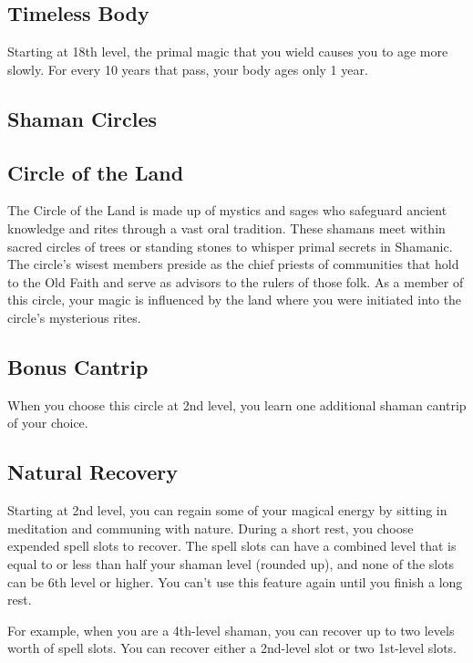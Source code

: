 \subsection{Timeless Body}

Starting at 18th level, the primal magic that you wield causes you to age more slowly. For every 10 years that pass, your body ages only 1 year.

\subsection{Shaman Circles}

\subsection{Circle of the Land}

The Circle of the Land is made up of mystics and sages who safeguard ancient knowledge and rites through a vast oral tradition. These shamans meet within sacred circles of trees or standing stones to whisper primal secrets in Shamanic. The circle's wisest members preside as the chief priests of communities that hold to the Old Faith and serve as advisors to the rulers of those folk. As a member of this circle, your magic is influenced by the land where you were initiated into the circle's mysterious rites.

\subsection{Bonus Cantrip}

When you choose this circle at 2nd level, you learn one additional shaman cantrip of your choice.

\subsection{Natural Recovery}

Starting at 2nd level, you can regain some of your magical energy by sitting in meditation and communing with nature. During a short rest, you choose expended spell slots to recover. The spell slots can have a combined level that is equal to or less than half your shaman level
(rounded up), and none of the slots can be 6th level or higher. You can't use this feature again until you finish a long rest.

For example, when you are a 4th-level shaman, you can recover up to two levels worth of spell slots. You can recover either a 2nd-level slot or two 1st-level slots.

